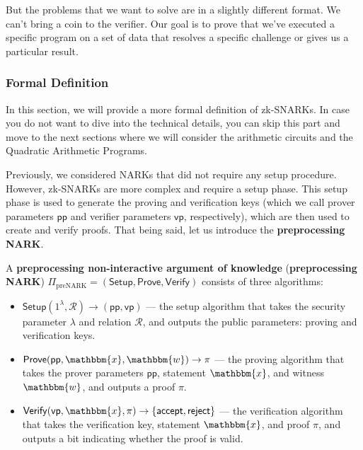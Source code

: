\documentclass[../../book.tex]{subfiles}
\begin{document}
But the problems that we want to solve are in a slightly different format. We can't bring a coin to
the verifier. Our goal is to prove that we've executed a specific program on a set of data that 
resolves a specific challenge or gives us a particular result.

\subsubsection{Formal Definition}

In this section, we will provide a more formal definition of zk-SNARKs. In case you do not want to
dive into the technical details, you can skip this part and move to the next sections where we will
consider the arithmetic circuits and the Quadratic Arithmetic Programs.

Previously, we considered NARKs that did not require any setup procedure. However, zk-SNARKs are
more complex and require a setup phase. This setup phase is used to generate the proving and
verification keys (which we call prover parameters $\mathsf{pp}$ and verifier parameters $\mathsf{vp}$, respectively), 
which are then used to create and verify proofs. That being said, let us introduce the \textbf{preprocessing NARK}.

\begin{definition}
    A \textbf{preprocessing non-interactive argument of knowledge}
    (\textbf{preprocessing NARK})
    $\Pi_{\text{preNARK}}=(\mathsf{Setup},\mathsf{Prove},\mathsf{Verify})$
    consists of three algorithms:
    \begin{itemize}
        \item $\mathsf{Setup}(1^\lambda, \mathcal{R}) \rightarrow (\mathsf{pp},
        \mathsf{vp})$ --- the setup algorithm that takes the security parameter
        $\lambda$ and relation $\mathcal{R}$, and outputs the public parameters:
        proving and verification keys.
        \item $\mathsf{Prove}(\mathsf{pp}, \mathbbm{x}, \mathbbm{w}) \rightarrow
        \pi$ --- the proving algorithm that takes the prover parameters
        $\mathsf{pp}$, statement $\mathbbm{x}$, and witness $\mathbbm{w}$, and outputs a proof
        $\pi$.
        \item $\mathsf{Verify}(\mathsf{vp}, \mathbbm{x}, \pi) \rightarrow
        \{\mathsf{accept}, \mathsf{reject}\}$ --- the verification algorithm
        that takes the verification key, statement $\mathbbm{x}$, and proof
        $\pi$, and outputs a bit indicating whether the proof is valid.
    \end{itemize}
\end{definition}
\end{document}
